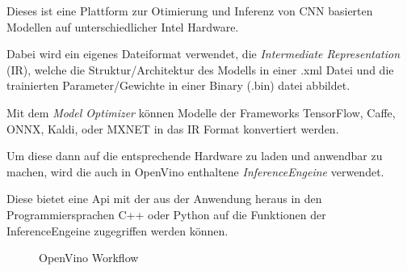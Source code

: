 Dieses ist eine Plattform zur Otimierung und Inferenz von 
CNN basierten Modellen auf unterschiedlicher Intel Hardware.

Dabei wird ein eigenes Dateiformat verwendet, die \textit{Intermediate 
Representation} (IR), welche die Struktur/Architektur des Modells 
in einer .xml Datei und die trainierten Parameter/Gewichte in 
einer Binary (.bin) datei abbildet.

Mit dem \textit{Model Optimizer} können Modelle der Frameworks 
TensorFlow, Caffe, ONNX, Kaldi, oder MXNET in das IR Format 
konvertiert werden.

Um diese dann auf die entsprechende Hardware zu laden und anwendbar 
zu machen, wird die auch in OpenVino enthaltene
\textit{InferenceEngeine} verwendet.

Diese bietet eine Api mit der aus der Anwendung heraus in den 
Programmiersprachen C++ oder Python auf die Funktionen der 
InferenceEngeine zugegriffen werden können.


\begin{figure}[H]
    \centering
    \def\svgwidth{0.9\textwidth}
    
    \caption{OpenVino Workflow}
    \label{fig:openvinoflow}
\end{figure}
